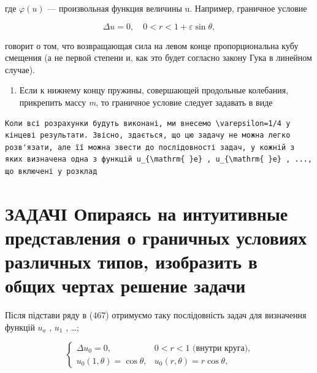 \documentclass[
  ukrainian,
]{article}
\providecommand{\tightlist}{%
  \setlength{\itemsep}{0pt}\setlength{\parskip}{0pt}}
\begin{document}
где \(\varphi(u)\) --- произвольная функция величины u. Например,
граничное условие

\[
\Delta u = 0, \quad 0 < r < 1 + \varepsilon \sin \theta,
\]

говорит о том, что возвращающая сила на левом конце пропорциональна кубу
смещения (а не первой степени и, как это будет согласно закону Гука в
линейном случае).

\begin{enumerate}
\def\labelenumi{\arabic{enumi}.}
\setcounter{enumi}{2}
\tightlist
\item
  Если к нижнему концу пружины, совершающей продольные колебания,
  прикрепить массу \emph{m}, то граничное условие следует задавать в
  виде
\end{enumerate}

\begin{verbatim}
Коли всі розрахунки будуть виконані, ми внесемо \varepsilon=1/4 у кінцеві результати. Звісно, здається, що цю задачу не можна легко розв'язати, але її можна звести до послідовності задач, у кожній з яких визначена одна з функцій u_{\mathrm{ }e} , u_{\mathrm{ }e} , ..., що включені у розклад
\end{verbatim}

\section{ЗАДАЧІ Опираясь на интуитивные представления о граничных
условиях различных типов, изобразить в общих чертах решение
задачи}\label{ux437ux430ux434ux430ux447ux456-ux43eux43fux438ux440ux430ux44fux441ux44c-ux43dux430-ux438ux43dux442ux443ux438ux442ux438ux432ux43dux44bux435-ux43fux440ux435ux434ux441ux442ux430ux432ux43bux435ux43dux438ux44f-ux43e-ux433ux440ux430ux43dux438ux447ux43dux44bux445-ux443ux441ux43bux43eux432ux438ux44fux445-ux440ux430ux437ux43bux438ux447ux43dux44bux445-ux442ux438ux43fux43eux432-ux438ux437ux43eux431ux440ux430ux437ux438ux442ux44c-ux432-ux43eux431ux449ux438ux445-ux447ux435ux440ux442ux430ux445-ux440ux435ux448ux435ux43dux438ux435-ux437ux430ux434ux430ux447ux438}

Після підстави ряду в (467) отримуємо таку послідовність задач для
визначення функцій \(u_a\) , \(u_1\) , \ldots;

\[
\begin{cases} \Delta u_{0} = 0, & 0 < r < 1 \text{ (внутри круга),} \\ u_{0}(1, \theta) = \cos \theta, & u_{0}(r, \theta) = r \cos \theta, \end{cases}
\]
\end{document}
